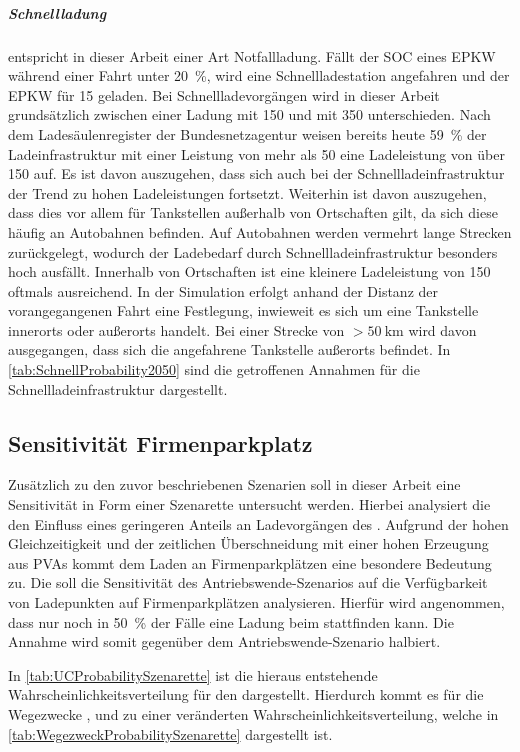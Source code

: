 \subparagraph{Schnellladung} entspricht in dieser Arbeit einer Art Notfallladung.
Fällt der \gls{SOC} eines \gls{EPKW} während einer Fahrt unter \SI{20}{\percent}, wird eine Schnellladestation angefahren und der \gls{EPKW} für \SI{15}{\Minuten} geladen.
Bei Schnellladevorgängen wird in dieser Arbeit grundsätzlich zwischen einer Ladung mit \SI{150}{\kw} und mit \SI{350}{\kw} unterschieden.
Nach dem Ladesäulenregister der Bundesnetzagentur \cite[][Stand: ]{BundesnetzagenturElektrizitaet2020} weisen bereits heute \SI{59}{\percent} der Ladeinfrastruktur mit einer Leistung von mehr als \SI{50}{\kw} eine Ladeleistung von über \SI{150}{\kw} auf.
Es ist davon auszugehen, dass sich auch bei der Schnellladeinfrastruktur der Trend zu hohen Ladeleistungen fortsetzt.
Weiterhin ist davon auszugehen, dass dies vor allem für Tankstellen außerhalb von Ortschaften gilt, da sich diese häufig an Autobahnen befinden.
Auf Autobahnen werden vermehrt lange Strecken zurückgelegt, wodurch der Ladebedarf durch Schnellladeinfrastruktur besonders hoch ausfällt.
Innerhalb von Ortschaften ist eine kleinere Ladeleistung von \SI{150}{\kw} oftmals ausreichend.
In der Simulation erfolgt anhand der Distanz der vorangegangenen Fahrt eine Festlegung, inwieweit es sich um eine Tankstelle innerorts oder außerorts handelt.
Bei einer Strecke von $> \SI{50}{\km}$ wird davon ausgegangen, dass sich die angefahrene Tankstelle außerorts befindet.
In \autoref{tab:SchnellProbability2050} sind die getroffenen Annahmen für die Schnellladeinfrastruktur dargestellt.




\subsection{Sensitivität \glqq Firmenparkplatz\grqq}

Zusätzlich zu den zuvor beschriebenen Szenarien soll in dieser Arbeit eine Sensitivität in Form einer Szenarette untersucht werden.
Hierbei analysiert die \SzeFirmenparkplatz den Einfluss eines geringeren Anteils an Ladevorgängen des \UC \Firmeparkplatz.
Aufgrund der hohen Gleichzeitigkeit und der zeitlichen Überschneidung mit einer hohen Erzeugung aus \glspl{PVA} kommt dem Laden an Firmenparkplätzen eine besondere Bedeutung zu.
Die \SzeFirmenparkplatz soll die Sensitivität des Antriebswende-Szenarios auf die Verfügbarkeit von Ladepunkten auf Firmenparkplätzen analysieren.
Hierfür wird angenommen, dass nur noch in \SI{50}{\percent} der Fälle eine Ladung beim \UC \Firmeparkplatz stattfinden kann.
Die Annahme wird somit gegenüber dem Antriebswende-Szenario halbiert.



In \autoref{tab:UCProbabilitySzenarette} ist die hieraus entstehende Wahrscheinlichkeitsverteilung für den \UC \Firmeparkplatz dargestellt.
Hierdurch kommt es für die Wegezwecke \Arbeitdot, \dienst und \Ausbildung zu einer veränderten Wahrscheinlichkeitsverteilung, welche in \autoref{tab:WegezweckProbabilitySzenarette} dargestellt ist.




\clearpage
